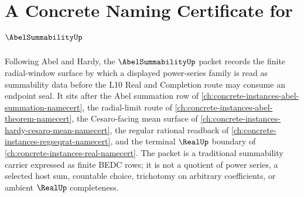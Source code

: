 \chapter{A Concrete Naming Certificate for $\AbelSummabilityUp$}
\label{ch:concrete-instances-abel-summability-namecert}

Following Abel and Hardy, the $\AbelSummabilityUp$ packet records the finite radial-window surface by which a displayed power-series family is read as summability data before the L10 Real and Completion route may consume an endpoint seal. It sits after the Abel summation row of \autoref{ch:concrete-instances-abel-summation-namecert}, the radial-limit route of \autoref{ch:concrete-instances-abel-theorem-namecert}, the Cesaro-facing mean surface of \autoref{ch:concrete-instances-hardy-cesaro-mean-namecert}, the regular rational readback of \autoref{ch:concrete-instances-regseqrat-namecert}, and the terminal $\RealUp$ boundary of \autoref{ch:concrete-instances-real-namecert}. The packet is a traditional summability carrier expressed as finite BEDC rows; it is not a quotient of power series, a selected host sum, countable choice, trichotomy on arbitrary coefficients, or ambient $\RealUp$ completeness.


